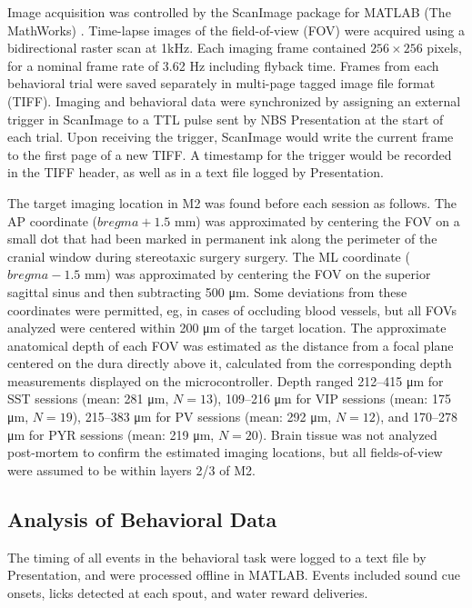 Image acquisition was controlled by the ScanImage package for MATLAB (The MathWorks) \citep{pologruto03}. Time-lapse images of the field-of-view (FOV) were acquired using a bidirectional raster scan at 1kHz. Each imaging frame contained $256 \times 256$ pixels, for a nominal frame rate of 3.62 Hz including flyback time. Frames from each behavioral trial were saved separately in multi-page tagged image file format (TIFF). Imaging and behavioral data were synchronized by assigning an external trigger in ScanImage to a TTL pulse sent by NBS Presentation at the start of each trial. Upon receiving the trigger, ScanImage would write the current frame to the first page of a new TIFF. A timestamp for the trigger would be recorded in the TIFF header, as well as in a text file logged by Presentation.        

The target imaging location in M2 was found before each session as follows. The AP coordinate ($\mathit{bregma}+1.5$ mm) was approximated by centering the FOV on a small dot that had been marked in permanent ink along the perimeter of the cranial window during stereotaxic surgery surgery. The ML coordinate ($\mathit{bregma}-1.5$ mm) was approximated by centering the FOV on the superior sagittal sinus and then subtracting 500 \si{\um}. Some deviations from these coordinates were permitted, eg, in cases of occluding blood vessels, but all FOVs analyzed were centered within 200 \si{\um} of the target location. The approximate anatomical depth of each FOV was estimated as the distance from a focal plane centered on the dura directly above it, calculated from the corresponding depth measurements displayed on the microcontroller. Depth ranged 212--415 \si{\um} for SST sessions (mean: 281 \si{\um}, $N=13$), 109--216 \si{\um} for VIP sessions (mean: 175 \si{\um}, $N=19$), 215--383 \si{\um} for PV sessions (mean: 292 \si{\um}, $N=12$), and 170--278 \si{\um} for PYR sessions (mean: 219 \si{\um}, $N=20$). Brain tissue was not analyzed post-mortem to confirm the estimated imaging locations, but all fields-of-view were assumed to be within layers 2/3 of M2.

\subsection*{Analysis of Behavioral Data}
The timing of all events in the behavioral task were logged to a text file by Presentation, and were processed offline in MATLAB. Events included sound cue onsets, licks detected at each spout, and water reward deliveries. 

